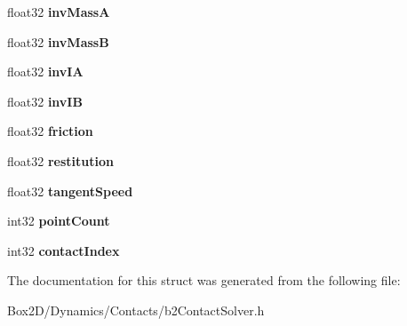 \begin{DoxyCompactItemize}
float32 {\bfseries inv\+MassA}
\item 
\mbox{\label{structb2_contact_velocity_constraint_ac75c816e94402ed4d93f232d211d4f62}} 
float32 {\bfseries inv\+MassB}
\item 
\mbox{\label{structb2_contact_velocity_constraint_ac6c18706a9ee89c5a682dc610e86e00f}} 
float32 {\bfseries inv\+IA}
\item 
\mbox{\label{structb2_contact_velocity_constraint_aae02d4fd8f60353385b9cc876dc78a81}} 
float32 {\bfseries inv\+IB}
\item 
\mbox{\label{structb2_contact_velocity_constraint_a11025786ae828eeeb60dfcd15358d934}} 
float32 {\bfseries friction}
\item 
\mbox{\label{structb2_contact_velocity_constraint_a6734f74c1970abc64ed7dcffd8737257}} 
float32 {\bfseries restitution}
\item 
\mbox{\label{structb2_contact_velocity_constraint_aaf6acabb0ef62eeac647250e2520a272}} 
float32 {\bfseries tangent\+Speed}
\item 
\mbox{\label{structb2_contact_velocity_constraint_a1decd7bf6a5dc61bd72d4e87b070a660}} 
int32 {\bfseries point\+Count}
\item 
\mbox{\label{structb2_contact_velocity_constraint_a4c76b9292f28859e2f8c9d075e79b873}} 
int32 {\bfseries contact\+Index}
\end{DoxyCompactItemize}


The documentation for this struct was generated from the following file\+:\begin{DoxyCompactItemize}
\item 
Box2\+D/\+Dynamics/\+Contacts/b2\+Contact\+Solver.\+h\end{DoxyCompactItemize}
